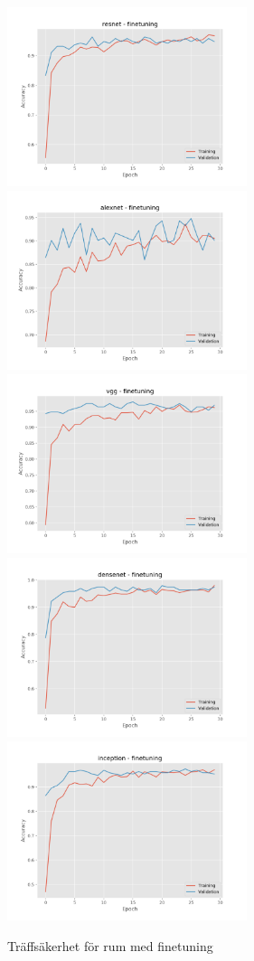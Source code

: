 \documentclass[]{kththesis}
\begin{document}
  \begin{figure}[h]
    \includegraphics[width=7cm]{r_a_resnet_fine}
    \includegraphics[width=7cm]{r_a_alexnet_fine}
    \includegraphics[width=7cm]{r_a_vgg_fine}
    \includegraphics[width=7cm]{r_a_densenet_fine}
    \includegraphics[width=7cm]{r_a_inception_fine}
    \caption{Träffsäkerhet för rum med finetuning}
    \label{fig:r_a_2}
  \end{figure}

\tailmatter
\end{document}
